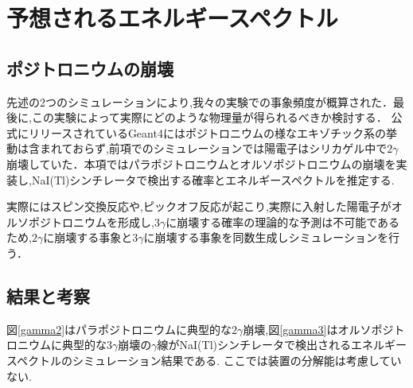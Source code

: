 \section{予想されるエネルギースペクトル}
\label{section_test3}

\subsection{ポジトロニウムの崩壊}

先述の2つのシミュレーションにより,我々の実験での事象頻度が概算された．最後に,この実験によって実際にどのような物理量が得られるべきか検討する．
公式にリリースされているGeant4にはポジトロニウムの様なエキゾチック系の挙動は含まれておらず,前項でのシミュレーションでは陽電子はシリカゲル中で$2\gamma$崩壊していた．本項ではパラポジトロニウムとオルソポジトロニウムの崩壊を実装し,NaI(Tl)シンチレータで検出する確率とエネルギースペクトルを推定する.

実際にはスピン交換反応や,ピックオフ反応が起こり,実際に入射した陽電子がオルソポジトロニウムを形成し,$3\gamma$に崩壊する確率の理論的な予測は不可能であるため,$2\gamma$に崩壊する事象と$3\gamma$に崩壊する事象を同数生成しシミュレーションを行う．

\subsection{結果と考察}

図\ref{gamma2}はパラポジトロニウムに典型的な$2\gamma$崩壊,図\ref{gamma3}はオルソポジトロニウムに典型的な$3\gamma$崩壊の$\gamma$線がNaI(Tl)シンチレータで検出されるエネルギースペクトルのシミュレーション結果である.
ここでは装置の分解能は考慮していない.

